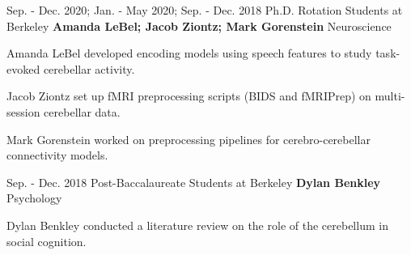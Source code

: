 \begin{cventries}
  \cventry
    {Sep. - Dec. 2020; Jan. - May 2020; Sep. - Dec. 2018} %
    {Ph.D. Rotation Students at Berkeley} %
    {\textbf{Amanda LeBel; Jacob Ziontz; Mark Gorenstein}}
    {Neuroscience}
   {
      \begin{cvitems} %
        \item {Amanda LeBel developed encoding models using speech features to study task-evoked cerebellar activity.}
        \item {Jacob Ziontz set up fMRI preprocessing scripts (BIDS and fMRIPrep) on multi-session cerebellar data.}
        \item {Mark Gorenstein worked on preprocessing pipelines for cerebro-cerebellar connectivity models.}
      \end{cvitems}
    }
    
  \cventry
    {Sep. - Dec. 2018} %
    {Post-Baccalaureate Students at Berkeley} %
    {\textbf{Dylan Benkley}}
    {Psychology}
   {
      \begin{cvitems} %
        \item {Dylan Benkley conducted a literature review on the role of the cerebellum in social cognition.}
      \end{cvitems}
    }

\end{cventries}
